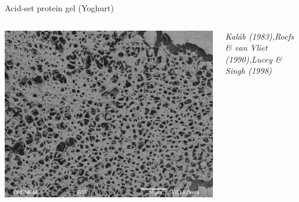 \documentclass[xcolor=table]{beamer}
\begin{document}
\begin{frame}{Acid-set protein gel (Yoghurt)}
\begin{columns}
\includegraphics[width=\textwidth, clip=true, trim=0 0 0 10cm]{MEB_cas4_gdl1_22}

\begin{scriptsize}
\textit{Kaláb (1983),\linebreak Roefs \& van Vliet (1990),\linebreak Lucey \& Singh (1998)}
\end{scriptsize}
\end{columns}
\end{frame}
\tikzset{external/force remake=false}
\end{document}
